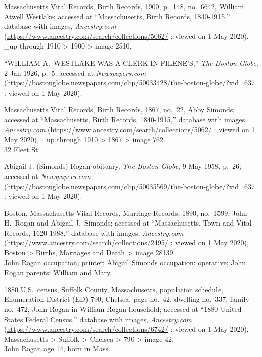 \begin{thebibliography}{999}
	Massachusetts Vital Records, Birth Records, 1900, p.\ 148, no.\ 6642, William Atwell Westlake; accessed at ``Massachusetts, Birth Records, 1840-1915,'' database with images, \textit{Ancestry.com} (\url{https://www.ancestry.com/search/collections/5062/} : viewed on 1 May 2020), \_up through 1910 > 1900 > image 2510.	
	
	``WILLIAM A.\ WESTLAKE WAS A CLERK IN FILENE'S,'' \textit{The Boston Globe}, 2 Jan 1926, p.\ 5; accessed at \textit{Newspapers.com} (\url{https://bostonglobe.newspapers.com/clip/50033428/the-boston-globe/?xid=637} : viewed on 1 May 2020).

	Massachusetts Vital Records, Birth Records, 1867, no.\ 22, Abby Simonds; accessed at ``Massachusetts, Birth Records, 1840-1915,'' database with images, \textit{Ancestry.com} (\url{https://www.ancestry.com/search/collections/5062/} : viewed on 1 May 2020), \_up through 1910 > 1867 > image 762.\\
	32 Fleet St.
	
	Abigail J. (Simonds) Rogan obituary, \textit{The Boston Globe}, 9 May 1958, p.\ 26; accessed at \textit{Newspapers.com} (\url{https://bostonglobe.newspapers.com/clip/50035569/the-boston-globe/?xid=637} : viewed on 1 May 2020).
	
	Boston, Massachusetts Vital Records, Marriage Records, 1890, no.\ 1599, John H.\ Rogan and Abigail J.\ Simonds; accessed at ``Massachusetts, Town and Vital Records, 1620-1988,'' database with images, \textit{Ancestry.com} (\url{https://www.ancestry.com/search/collections/2495/} : viewed on 1 May 2020), Boston > Births, Marriages and Death > image 28139.\\
	John Rogan occupation; printer; Abigail Simonds occupation: operative; John Rogan parents: William and Mary.
	
	1880 U.S.\ census, Suffolk County, Massachusetts, population schedule, Enumeration District (ED) 790, Chelsea, page no.\ 42, dwelling no.\ 337, family no.\ 472, John Rogan in William Rogan household; accessed at ``1880 United States Federal Census,'' database with images, \textit{Ancestry.com} (\url{https://www.ancestry.com/search/collections/6742/} : viewed on 1 May 2020), Massachusetts > Suffolk > Chelsea > 790 > image 42.\\
	John Rogan age 14, born in Mass.
	

\end{thebibliography}
